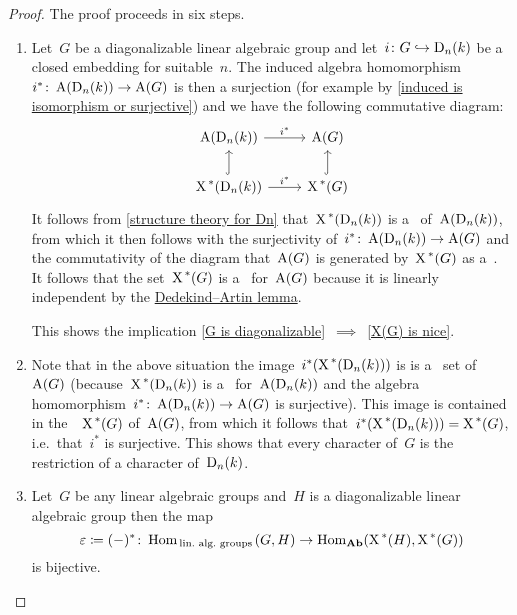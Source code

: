 \begin{proof}
  The proof proceeds in six steps.
  \begin{enumerate}[label = Step~\arabic*]
    \item
      Let~$G$ be a diagonalizable linear algebraic group and let~$i \colon G \hookrightarrow \operatorname{D}_n(k)$ be a closed embedding for suitable~$n$.
      The induced algebra homomorphism~$i^* \colon \operatorname{A}(\operatorname{D}_n(k)) \to \operatorname{A}(G)$ is then a surjection (for example by \cref{induced is isomorphism or surjective}) and we have the following commutative diagram:
      \[
        \begin{tikzcd}
            \coord(\Diag_n(k))
            \arrow{r}[above]{i^*}
          & \coord(G)
          \\
            \chargroup(\Diag_n(k))
            \arrow{r}[above]{i^*}
            \arrow[hook]{u}
          & \chargroup(G)
            \arrow[hook]{u}
        \end{tikzcd}
      \]
      It follows from \cref{structure theory for Dn} that~$\operatorname{X}^{\,*}(\operatorname{D}_n(k))$ is a~ of~$\operatorname{A}(\operatorname{D}_n(k))$, from which it then follows with the surjectivity of~$i^* \colon \operatorname{A}(\operatorname{D}_n(k)) \to \operatorname{A}(G)$ and the commutativity of the diagram that~$\operatorname{A}(G)$ is generated by~$\operatorname{X}^{\,*}(G)$ as a~.
      It follows that the set~$\operatorname{X}^{\,*}(G)$ is a~ for~$\operatorname{A}(G)$ because it is linearly independent by the \hyperref[dedekind artin lemma]{Dedekind\nobreakdash--Artin lemma}.
      
      This shows the implication \ref*{G is diagonalizable}~$\implies$~\ref*{X(G) is nice}.
      
    \item
      \label{every character a restriction}
      Note that in the above situation the image~$i^*(\operatorname{X}^{\,*}(\operatorname{D}_n(k)))$ is is a~ set of~$\operatorname{A}(G)$ (because~$\operatorname{X}^{\,*}(\operatorname{D}_n(k))$ is a~ for~$\operatorname{A}(\operatorname{D}_n(k))$ and the algebra homomorphism~$i^* \colon \operatorname{A}(\operatorname{D}_n(k)) \to \operatorname{A}(G)$ is surjective).
      This image is contained in the~~$\operatorname{X}^{\,*}(G)$ of~$\operatorname{A}(G)$, from which it follows that~$i^*(\operatorname{X}^{\,*}(\operatorname{D}_n(k))) = \operatorname{X}^{\,*}(G)$, i.e.\ that~$i^*$ is surjective.
      This shows that every character of~$G$ is the restriction of a character of~$\operatorname{D}_n(k)$.
    
    \item
      \label{fully faithful}
      Let~$G$ be any linear algebraic groups and~$H$ is a diagonalizable linear algebraic group then the map
      \[
                  \varepsilon
        \coloneqq  (-)^*
        \colon    \operatorname{Hom}_{\,\text{lin.\ alg.\ groups}\,}(G, H)
        \to       \operatorname{Hom}_{\mathbf{Ab}}( \operatorname{X}^{\,*}(H), \operatorname{X}^{\,*}(G) )
      \]
      is bijective.
      

\end{enumerate}
\end{proof}
